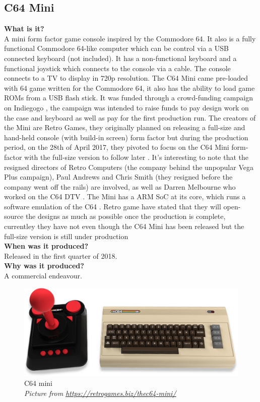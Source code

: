\subsection{C64 Mini}
\textbf{What is it?}\\
A mini form factor game console inspired by the Commodore 64. It also is a fully functional Commodore 64-like computer which can be control via a USB connected keyboard (not included). It has a non-functional keyboard and a functional joystick which connects to the console via a cable. The console connects to a TV to display in 720p resolution. The C64 Mini came pre-loaded with 64 game written for the Commodore 64, it also has the ability to load game ROMs from a USB flash stick. It was funded through a crowd-funding campaign on Indiegogo 
\cite{RN124}, the campaign was intended to raise funds to pay design work on the case and keyboard as well as pay for the first production run. The creators of the Mini are Retro Games, they originally planned on releasing a full-size and hand-held console (with build-in screen) form factor but during the production period, on the 28th of April 2017, they pivoted to focus on the C64 Mini form-factor with the full-size version to follow later 
\cite{RN160}. It's interesting to note that the resigned directors of Retro Computers (the company behind the unpopular Vega Plus campaign), Paul Andrews and Chris Smith (they resigned before the company went off the rails) are involved, as well as Darren Melbourne who worked on the C64 DTV 
\cite{RN127}. The Mini has a ARM SoC at its core, which runs a software emulation of the C64 
\cite{RN160}. Retro game have stated that they will open-source the designs as much as possible once the production is complete, currentley they have not even though the C64 Mini has been released but the full-size version is still under production\\

\textbf{When was it produced?}\\
Released in the first quarter of 2018. \\

\textbf{Why was it produced?}\\
A commercial endeavour. \\

\begin{figure} \begin{center}
\includegraphics[width=.3\linewidth]{pics/C64_mini} 
\end{center} 
\caption{C64 mini\\ \textit{\small{Picture from \url {https://retrogames.biz/thec64-mini/}}}}
\label{C64_mini}
\end{figure}

